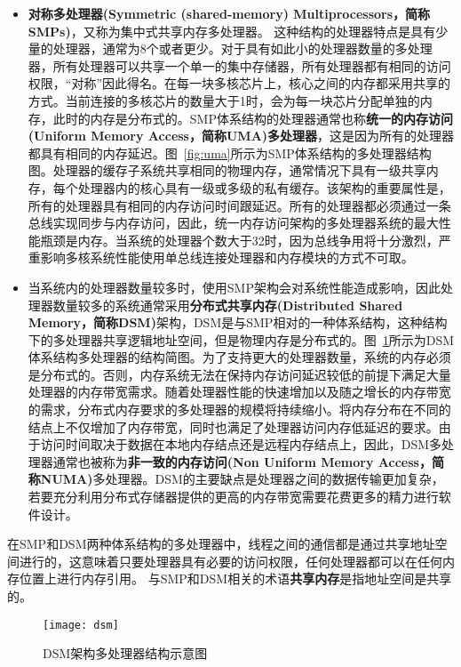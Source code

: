 \begin{itemize}
	\item \textbf{对称多处理器(Symmetric (shared-memory) Multiprocessors，简称SMPs)}，又称为集中式共享内存多处理器。
	这种结构的处理器特点是具有少量的处理器，通常为8个或者更少。对于具有如此小的处理器数量的多处理器，所有处理器可以共享一个单一的集中存储器，所有处理器都有相同的访问权限，“对称”因此得名。在每一块多核芯片上，核心之间的内存都采用共享的方式。当前连接的多核芯片的数量大于1时，会为每一块芯片分配单独的内存，此时的内存是分布式的。SMP体系结构的处理器通常也称\textbf{统一的内存访问(Uniform Memory Access，简称UMA)多处理器}，这是因为所有的处理器都具有相同的内存延迟。图~\ref{fig:uma}所示为SMP体系结构的多处理器结构图。处理器的缓存子系统共享相同的物理内存，通常情况下具有一级共享内存，每个处理器内的核心具有一级或多级的私有缓存。该架构的重要属性是，所有的处理器具有相同的内存访问时间跟延迟。所有的处理器都必须通过一条总线实现同步与内存访问，因此，统一内存访问架构的多处理器系统的最大性能瓶颈是内存。当系统的处理器个数大于32时，因为总线争用将十分激烈，严重影响多核系统性能使用单总线连接处理器和内存模块的方式不可取。
	\item 当系统内的处理器数量较多时，使用SMP架构会对系统性能造成影响，因此处理器数量较多的系统通常采用\textbf{分布式共享内存(Distributed Shared Memory，简称DSM)}架构，DSM是与SMP相对的一种体系结构，这种结构下的多处理器共享逻辑地址空间，但是物理内存是分布式的。图~\ref{fig:dsm}所示为DSM体系结构多处理器的结构简图。为了支持更大的处理器数量，系统的内存必须是分布式的。否则，内存系统无法在保持内存访问延迟较低的前提下满足大量处理器的内存带宽需求。随着处理器性能的快速增加以及随之增长的内存带宽的需求，分布式内存要求的多处理器的规模将持续缩小。将内存分布在不同的结点上不仅增加了内存带宽，同时也满足了处理器访问内存低延迟的要求。由于访问时间取决于数据在本地内存结点还是远程内存结点上，因此，DSM多处理器通常也被称为\textbf{非一致的内存访问(Non Uniform Memory Access，简称NUMA)}多处理器。DSM的主要缺点是处理器之间的数据传输更加复杂，若要充分利用分布式存储器提供的更高的内存带宽需要花费更多的精力进行软件设计。
\end{itemize}

在SMP和DSM两种体系结构的多处理器中，线程之间的通信都是通过共享地址空间进行的，这意味着只要处理器具有必要的访问权限，任何处理器都可以在任何内存位置上进行内存引用。
与SMP和DSM相关的术语\textbf{共享内存}是指地址空间是共享的。

\begin{figure}
\centering
\texttt{[image: dsm]}
\caption{DSM架构多处理器结构示意图}
\label{fig:dsm}
\end{figure}



